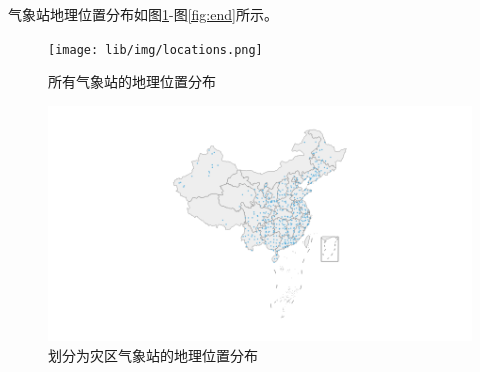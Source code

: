 气象站地理位置分布如图\ref{fig:location}-图\ref{fig:end}所示。

\begin{figure}[H]
    \centering
    \begin{minipage}{0.48\linewidth}
        \texttt{[image: lib/img/locations.png]}
        \caption{所有气象站的地理位置分布}
        \label{fig:location}
    \end{minipage}
    \begin{minipage}{0.48\linewidth}
        \includegraphics[width=\textwidth, trim=200 0 200 0]{lib/img/near.png}
        \caption{划分为灾区气象站的地理位置分布}
    \end{minipage}
\end{figure}
